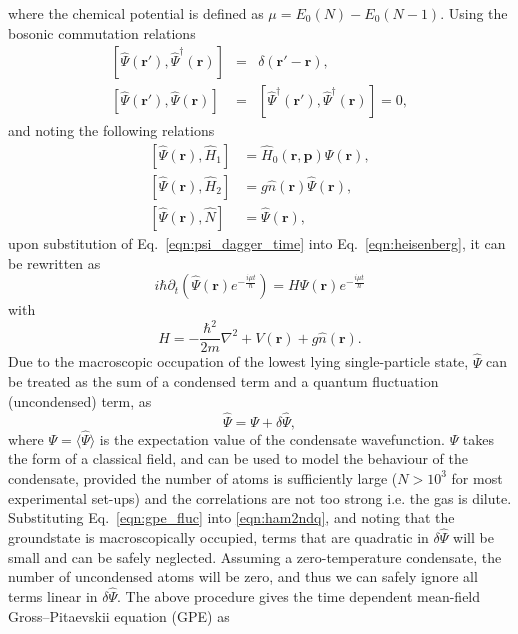 where the chemical potential is defined as $\mu=E_0(N) - E_0(N-1)$. Using the bosonic commutation relations
\begin{eqnarray}
\left[\hat{\Psi}(\mathbf{r}'), \hat{\Psi}^{\dagger}(\mathbf{r})\right] &=& \delta(\mathbf{r}' - \mathbf{r}), \\
\left[\hat{\Psi}(\mathbf{r}'), \hat{\Psi}(\mathbf{r})\right] &=& \left[\hat{\Psi}^{\dagger}(\mathbf{r}'), \hat{\Psi}^{\dagger}(\mathbf{r})\right] = 0,
\end{eqnarray}
and noting the following relations
\begin{align}
\left[\hat{\Psi}(\mathbf{r}),\hat{H}_1 \right] & = \hat{H}_0(\mathbf{r},\mathbf{p})\hat{\Psi}(\mathbf{r}), \\
\left[\hat{\Psi}(\mathbf{r}),\hat{H}_2 \right] & = g\hat{n}(\textbf{r})\hat{\Psi}(\mathbf{r}), \\
\left[\hat{\Psi}(\mathbf{r}),\hat{N} \right] & = \hat{\Psi}(\textbf{r}) ,
\end{align}
upon substitution of Eq.~\eqref{eqn:psi_dagger_time} into Eq.~\eqref{eqn:heisenberg}, it can be rewritten as
\begin{equation}\label{eqn:almost_gpe}
    i \hbar \partial_t \left( \hat{\Psi}(\mathbf{r}) e^{-\frac{i\mu t}{\hbar}} \right) = H \hat{\Psi}(\mathbf{r}) e^{-\frac{i\mu t}{\hbar}}
\end{equation}
with
\begin{equation}\label{eqn:h_many}
H =  -\frac{\hbar^2}{2m}\nabla^2  + V(\mathbf{r}) + g\hat{n}(\mathbf{r}).
\end{equation}
Due to the macroscopic occupation of the lowest lying single-particle state, $\hat{\Psi}$ can be treated as the sum of a condensed term and a quantum fluctuation (uncondensed) term, as
\begin{equation}\label{eqn:gpe_fluc}
    \hat{\Psi} = \Psi + \delta\hat{\Psi},
\end{equation}
where $\Psi = \langle \hat{\Psi} \rangle$ is the expectation value of the condensate wavefunction. $\Psi$ takes the form of a classical field, and can be used to model the behaviour of the condensate, provided the number of atoms is sufficiently large ($N>10^3$ for most experimental set-ups) and the correlations are not too strong i.e. the gas is dilute. Substituting Eq.~\eqref{eqn:gpe_fluc} into \eqref{eqn:ham2ndq}, and noting that the groundstate is macroscopically occupied, terms that are quadratic in $\delta \hat{\Psi}$ will be small and can be safely neglected. Assuming a zero-temperature condensate, the number of uncondensed atoms will be zero, and thus we can safely ignore all terms linear in $\delta\hat{\Psi}$. The above procedure gives the time dependent mean-field Gross--Pitaevskii equation (GPE) as
